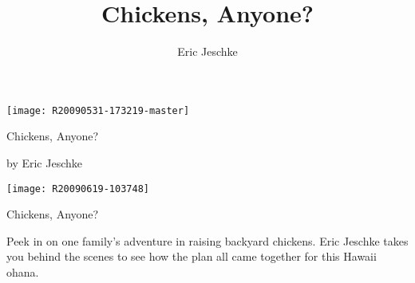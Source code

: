 \documentclass[10pt,final,openany]{book}
\title{Chickens, Anyone?}
\author{Eric Jeschke}
\begin{document}
\pagestyle{empty}

\texttt{[image: R20090531-173219-master]}

\begin{center}
{\huge Chickens, Anyone?}

{\Large by Eric Jeschke}
\end{center}
\newpage



\newpage

\pagestyle{empty}

\texttt{[image: R20090619-103748]}

\begin{center}
{\LARGE Chickens, Anyone?}
\end{center}

{\large Peek in on one family's adventure in raising backyard chickens.  Eric
Jeschke takes you behind the scenes to see how the plan all came
together for this Hawaii ohana.}
\end{document}
